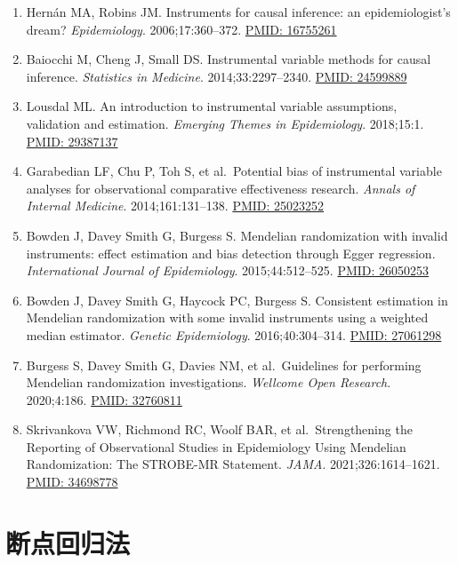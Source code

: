 \documentclass[
  chinese-hans,
  letterpaper,
  DIV=11,
  numbers=noendperiod]{scrreprt}
\providecommand{\tightlist}{%
  \setlength{\itemsep}{0pt}\setlength{\parskip}{0pt}}
\begin{document}
\begin{enumerate}
\def\labelenumi{\arabic{enumi}.}
\tightlist
\item
  Hernán MA, Robins JM. Instruments for causal inference: an
  epidemiologist's dream? \emph{Epidemiology}. 2006;17:360--372.
  \href{https://pubmed.ncbi.nlm.nih.gov/16755261/}{PMID: 16755261}
\item
  Baiocchi M, Cheng J, Small DS. Instrumental variable methods for
  causal inference. \emph{Statistics in Medicine}. 2014;33:2297--2340.
  \href{https://pubmed.ncbi.nlm.nih.gov/24599889/}{PMID: 24599889}
\item
  Lousdal ML. An introduction to instrumental variable assumptions,
  validation and estimation. \emph{Emerging Themes in Epidemiology}.
  2018;15:1. \href{https://pubmed.ncbi.nlm.nih.gov/29387137/}{PMID:
  29387137}
\item
  Garabedian LF, Chu P, Toh S, et al.~Potential bias of instrumental
  variable analyses for observational comparative effectiveness
  research. \emph{Annals of Internal Medicine}. 2014;161:131--138.
  \href{https://pubmed.ncbi.nlm.nih.gov/25023252/}{PMID: 25023252}
\item
  Bowden J, Davey Smith G, Burgess S. Mendelian randomization with
  invalid instruments: effect estimation and bias detection through
  Egger regression. \emph{International Journal of Epidemiology}.
  2015;44:512--525.
  \href{https://pubmed.ncbi.nlm.nih.gov/26050253/}{PMID: 26050253}
\item
  Bowden J, Davey Smith G, Haycock PC, Burgess S. Consistent estimation
  in Mendelian randomization with some invalid instruments using a
  weighted median estimator. \emph{Genetic Epidemiology}.
  2016;40:304--314.
  \href{https://pubmed.ncbi.nlm.nih.gov/27061298/}{PMID: 27061298}
\item
  Burgess S, Davey Smith G, Davies NM, et al.~Guidelines for performing
  Mendelian randomization investigations. \emph{Wellcome Open Research}.
  2020;4:186. \href{https://pubmed.ncbi.nlm.nih.gov/32760811/}{PMID:
  32760811}
\item
  Skrivankova VW, Richmond RC, Woolf BAR, et al.~Strengthening the
  Reporting of Observational Studies in Epidemiology Using Mendelian
  Randomization: The STROBE-MR Statement. \emph{JAMA}.
  2021;326:1614--1621.
  \href{https://pubmed.ncbi.nlm.nih.gov/34698778/}{PMID: 34698778}
\end{enumerate}


\chapter{断点回归法}\label{ux65adux70b9ux56deux5f52ux6cd5}
\end{document}
